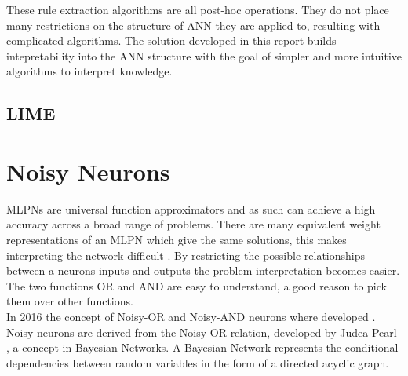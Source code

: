 These rule extraction algorithms are all post-hoc operations. They do not place many restrictions on the structure of ANN they are applied to, resulting with complicated algorithms. The solution developed in this report builds intepretability into the ANN structure with the goal of simpler and more intuitive algorithms to interpret knowledge.

\subsection{LIME}

\section{Noisy Neurons} \label{sec:background-noisy-neurons}
MLPNs are universal function approximators and as such can achieve a high accuracy across a broad range of problems. There are many equivalent weight representations of an MLPN which give the same solutions, this makes interpreting the network difficult \cite{LearningLogicalActivations}. By restricting the possible relationships between a neurons inputs and outputs the problem interpretation becomes easier. The two functions OR and AND are easy to understand, a good reason to pick them over other functions.\\
 
In 2016 the concept of Noisy-OR and Noisy-AND neurons where developed \cite{LearningLogicalActivations}. Noisy neurons are derived from the Noisy-OR relation\cite{LearningLogicalActivations}, developed by Judea Pearl \cite{russell1995modern}, a concept in Bayesian Networks. A Bayesian Network represents the conditional dependencies between random variables in the form of a directed acyclic graph.

